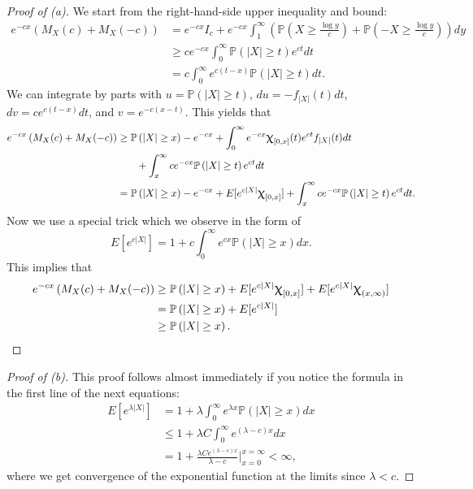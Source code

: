 \documentclass[12pt,reqno]{article}
\theoremstyle{plain}
\theoremstyle{definition}
\newcommand{\PP}[1]{\ensuremath{\mathbb{P}\left(#1\right)}}
\renewcommand{\chi}{\scalebox{1.25}{$\upchi$}}
\begin{document}
\begin{proof}[Proof of (a)]
We start from the right-hand-side upper inequality and bound: 
\begin{align*} 
e^{-cx}\left(M_X(c) + M_X(-c)\right) & = e^{-cx} I_c + e^{-cx} 
     \int_1^{\infty}\left(\PP{X \geq \frac{\log y}{c}} + 
     \PP{-X \geq \frac{\log y}{c}}\right) dy \\ 
     & \geq c e^{-cx} \int_0^{\infty} \PP{|X| \geq t} e^{ct} dt \\ 
     & = c \int_0^{\infty} e^{c(t-x)} \PP{|X| \geq t} dt. 
\end{align*} 
We can integrate by parts with $u = \PP{|X| \geq t}$, 
$du = -f_{|X|}(t) dt$, $dv = c e^{c(t-x)} dt$, and $v = e^{-c(x-t)}$. 
This yields that 
\begin{align*} 
e^{-cx}\left(M_X(c) + M_X(-c)\right) & \geq 
     \PP{|X| \geq x} - e^{-cx} + \int_0^{\infty} e^{-cx} \chi_{[0,x]}(t) 
     e^{ct} f_{|X|}(t) dt \\ 
     & \phantom{==\ } + 
     \int_x^{\infty} c e^{-cx} \PP{|X| \geq t} e^{ct} dt \\ 
     & = 
     \PP{|X| \geq x} -e^{-cx} + E[e^{c|X|} \chi_{[0,x]}] + 
     \int_x^{\infty} c e^{-cx} \PP{|X| \geq t} e^{ct} dt. 
\end{align*} 
Now we use a special trick which we observe in the form of 
\[
E[e^{c |X|}] = 1 + c \int_0^{\infty} e^{cx} \PP{|X| \geq x} dx. 
\]
This implies that 
\begin{align*} 
e^{-cx}\left(M_X(c) + M_X(-c)\right) & \geq 
     \PP{|X| \geq x} + E[e^{c|X|} \chi_{[0,x]}] + 
     E[e^{c|X|} \chi_{(x,\infty)}] \\ 
     & = \PP{|X| \geq x} + E[e^{c|X|}] \\ 
     & \geq \PP{|X| \geq x}. 
     \qedhere
\end{align*} 
\end{proof} 
\begin{proof}[Proof of (b)] 
This proof follows almost immediately if you notice the formula in the 
first line of the next equations:
\begin{align*} 
E[e^{\lambda |X|}] & = 1 + \lambda \int_0^{\infty} e^{\lambda x} 
     \PP{|X| \geq x} dx \\ 
     & \leq 1 + \lambda C \int_0^{\infty} e^{(\lambda-c)x} dx \\ 
     & = 1 + \frac{\lambda C e^{(\lambda-c)x}}{\lambda - c} 
     \Biggr\rvert_{x=0}^{x=\infty} < \infty, 
\end{align*} 
where we get convergence of the exponential function at the limits 
since $\lambda < c$. 
\end{proof} 
\end{document}
